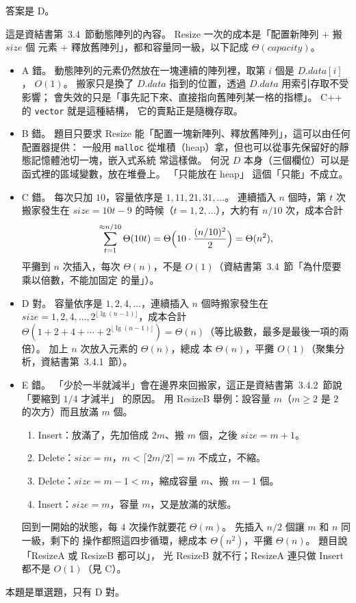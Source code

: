 \begin{pastsoln}
答案是 D。

這是資結書第~3.4~節動態陣列的內容。 Resize 一次的成本是「配置新陣列 $+$ 搬 $\mathit{size}$ 個
元素 $+$ 釋放舊陣列」，都和容量同一級，以下記成 $\Theta(\mathit{capacity})$。
\begin{itemize}
\item A 錯。 動態陣列的元素仍然放在一塊連續的陣列裡，取第 $i$ 個是 $D.\mathit{data}[i]$，
$O(1)$。 搬家只是換了 $D.\mathit{data}$ 指到的位置，透過 $D.\mathit{data}$ 用索引存取不受影響；
會失效的只是「事先記下來、直接指向舊陣列某一格的指標」。 C++ 的 \texttt{vector} 就是這種結構，
它的賣點正是隨機存取。
\item B 錯。 題目只要求 Resize 能「配置一塊新陣列、釋放舊陣列」，這可以由任何配置器提供：
一般用 \texttt{malloc} 從堆積（heap）拿，但也可以從事先保留好的靜態記憶體池切一塊，嵌入式系統
常這樣做。 何況 $D$ 本身（三個欄位）可以是函式裡的區域變數，放在堆疊上。 「只能放在 heap」
這個「只能」不成立。
\item C 錯。 每次只加 $10$，容量依序是 $1, 11, 21, 31, \ldots$。 連續插入 $n$ 個時，第
$t$ 次搬家發生在 $\mathit{size} = 10t - 9$ 的時候（$t = 1, 2, \ldots$），大約有 $n/10$ 次，成本合計
\[
\sum_{t=1}^{\approx n/10} \Theta(10t) = \Theta\Bigl(10 \cdot \frac{(n/10)^2}{2}\Bigr) = \Theta(n^2),
\]
平攤到 $n$ 次插入，每次 $\Theta(n)$，不是 $O(1)$（資結書第~3.4~節「為什麼要乘以倍數，不能加固定
的量」）。
\item D 對。 容量依序是 $1, 2, 4, \ldots$，連續插入 $n$ 個時搬家發生在 $\mathit{size} = 1, 2, 4,
\ldots, 2^{\lfloor \lg (n-1) \rfloor}$，成本合計 $\Theta(1 + 2 + 4 + \cdots + 2^{\lfloor \lg (n-1)
\rfloor}) = \Theta(n)$（等比級數，最多是最後一項的兩倍）。 加上 $n$ 次放入元素的 $\Theta(n)$，總成
本 $\Theta(n)$，平攤 $O(1)$（聚集分析，資結書第~3.4.1~節）。
\item E 錯。 「少於一半就減半」會在邊界來回搬家，這正是資結書第~3.4.2~節說「要縮到 $1/4$ 才減半」
的原因。 用 ResizeB 舉例：設容量 $m$（$m \ge 2$ 是 $2$ 的次方）而且放滿 $m$ 個。
  \begin{enumerate}[label=(\arabic*)]
  \item Insert：放滿了，先加倍成 $2m$、搬 $m$ 個，之後 $\mathit{size} = m + 1$。
  \item Delete：$\mathit{size} = m$，$m < \lceil 2m/2 \rceil = m$ 不成立，不縮。
  \item Delete：$\mathit{size} = m - 1 < m$，縮成容量 $m$、搬 $m - 1$ 個。
  \item Insert：$\mathit{size} = m$，容量 $m$，又是放滿的狀態。
  \end{enumerate}
回到一開始的狀態，每 $4$ 次操作就要花 $\Theta(m)$。 先插入 $n/2$ 個讓 $m$ 和 $n$ 同一級，剩下的
操作都照這四步循環，總成本 $\Theta(n^2)$，平攤 $\Theta(n)$。 題目說「ResizeA 或 ResizeB 都可以」，
光 ResizeB 就不行；ResizeA 連只做 Insert 都不是 $O(1)$（見 C）。
\end{itemize}
本題是單選題，只有 D 對。
\end{pastsoln}
